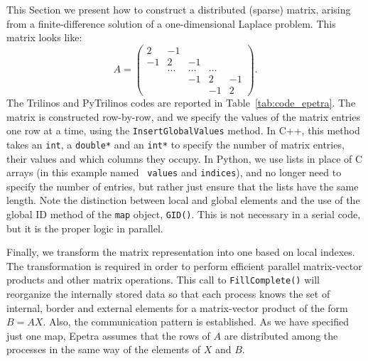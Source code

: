 \documentclass[10pt,relax]{SANDreport}
\begin{document}
This Section we present how to construct a
distributed (sparse) matrix, arising from a finite-difference solution
of a one-dimensional Laplace problem. This matrix looks like:
\begin{equation*}
  A = \begin{pmatrix}
     2 & -1     &        &        &    \\
    -1 &  2     & -1     &        &    \\
       & \ldots & \ldots & \ldots &    \\
       &        & -1     & 2      & -1 \\
       &        &        & -1     & 2
\end{pmatrix}.
\end{equation*}
The Trilinos and PyTrilinos codes are reported in Table~\ref{tab:code_epetra}.
The matrix is constructed row-by-row, and
we specify the values of the matrix entries one row at a time,
using the {\tt InsertGlobalValues} method.  In C++, this method takes
an {\tt int}, a {\tt double*} and an {\tt int*} to specify the number
of matrix entries, their values and which columns they occupy.  In
Python, we use lists in place of C arrays (in this example named {\tt
  values} and {\tt indices}), and no longer need to specify the number
of entries, but rather just ensure that the lists have the same
length.
Note the distinction between local and global elements and the use of
the global ID method of the {\tt map} object, {\tt GID()}.  This is
not necessary in a serial code, but it is the proper logic in
parallel.

Finally, we transform the matrix representation into one based on
local indexes. The transformation is required in order to perform
efficient parallel matrix-vector products and other matrix
operations. This call to {\tt FillComplete()} will reorganize the
internally stored data so that each process knows the set of
internal, border and external elements for a matrix-vector product
of the form $B = AX$. Also, the communication pattern is
established. As we have specified just one map, Epetra assumes that
the rows of $A$ are distributed among the processes in the same way
of the elements of $X$ and $B$.
\end{document}
